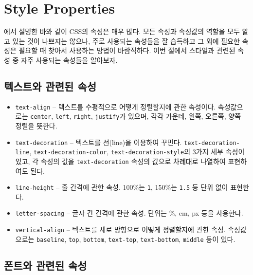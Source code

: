 \section{Style Properties} \label{sect:style-properties}

에서 설명한 바와 같이 CSS의 속성은 매우 많다. 모든 속성과 속성값의 역할을 모두 알고 있는 것이 나쁘지는 않으나, 주로 사용되는 속성들을 잘 습득하고 그 외에 필요한 속성은 필요할 때 찾아서 사용하는 방법이 바람직하다. 이번 절에서 스타일과 관련된 속성 중 자주 사용되는 속성들을 알아보자.

\subsection*{텍스트와 관련된 속성}

\begin{itemize}
    \item \texttt{text-align} – 텍스트를 수평적으로 어떻게 정렬할지에 관한 속성이다. 속성값으로는 \texttt{center}, \texttt{left}, \texttt{right}, \texttt{justify}가 있으며, 각각 가운데, 왼쪽, 오른쪽, 양쪽 정렬을 뜻한다.
    \item \texttt{text-decoration} – 텍스트를 선(line)을 이용하여 꾸민다. \texttt{text-decoration-line}, \texttt{text-decoration-color}, \texttt{text-decoration-style}의 3가지 세부 속성이 있고, 각 속성의 값을 \texttt{text-decoration} 속성의 값으로 차례대로 나열하여 표현하여도 된다.	
    \item \texttt{line-height} – 줄 간격에 관한 속성. 100\%는 \texttt{1}, 150\%는 \texttt{1.5} 등 단위 없이 표현한다.
    \item \texttt{letter-spacing} – 글자 간 간격에 관한 속성. 단위는 \%, em, px 등을 사용한다. 
    \item \texttt{vertical-align} – 텍스트를 세로 방향으로 어떻게 정렬할지에 관한 속성. 속성값으로는 \texttt{baseline}, \texttt{top}, \texttt{bottom}, \texttt{text-top}, \texttt{text-bottom}, \texttt{middle} 등이 있다.
\end{itemize}

\subsection*{폰트와 관련된 속성}

